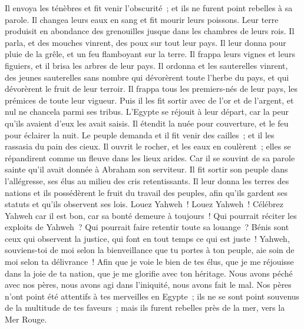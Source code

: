 \begin{multicols}{2}
Il envoya les ténèbres et fit venir l'obscurité~; et ils ne furent point rebelles à sa parole.
Il changea leurs eaux en sang et fit mourir leurs poissons.
Leur terre produisit en abondance des grenouilles jusque dans les chambres de leurs rois.
Il parla, et des mouches vinrent, des poux sur tout leur pays.
Il leur donna pour pluie de la grêle, et un feu flamboyant sur la terre.
Il frappa leurs vignes et leurs figuiers, et il brisa les arbres de leur pays.
Il ordonna et les sauterelles vinrent, des jeunes sauterelles sans nombre
qui dévorèrent toute l'herbe du pays, et qui dévorèrent le fruit de leur terroir.
Il frappa tous les premiers-nés de leur pays, les prémices de toute leur vigueur.
Puis il les fit sortir avec de l'or et de l'argent, et nul ne chancela parmi ses tribus.
L'Egypte se réjouit à leur départ, car la peur qu'ils avaient d'eux les avait saisis.
Il étendit la nuée pour couverture, et le feu pour éclairer la nuit.
Le peuple demanda et il fit venir des cailles~; et il les rassasia du pain des cieux.
Il ouvrit le rocher, et les eaux en coulèrent~; elles se répandirent comme un fleuve dans les lieux arides.
Car il se souvint de sa parole sainte qu'il avait donnée à Abraham son serviteur.
Il fit sortir son peuple dans l'allégresse, ses élus au milieu des cris retentissants.
Il leur donna les terres des nations et ils possédèrent le fruit du travail des peuples,
afin qu'ils gardent ses statuts et qu'ils observent ses lois. Louez Yahweh~!
\VerseOne{}Louez Yahweh~! Célébrez Yahweh car il est bon, car sa bonté demeure à toujours~!
Qui pourrait réciter les exploits de Yahweh~? Qui pourrait faire retentir toute sa louange~?
Bénis sont ceux qui observent la justice, qui font en tout temps ce qui est juste~!
Yahweh, souviens-toi de moi selon la bienveillance que tu portes à ton peuple, aie soin de moi selon ta délivrance~!
Afin que je voie le bien de tes élus, que je me réjouisse dans la joie de ta nation, que je me glorifie avec ton héritage.
Nous avons péché avec nos pères, nous avons agi dans l'iniquité, nous avons fait le mal.
Nos pères n'ont point été attentifs à tes merveilles en Egypte~; ils ne se sont point souvenus de la multitude de tes faveurs~; mais ils furent rebelles près de la mer, vers la Mer Rouge.

\end{multicols}

